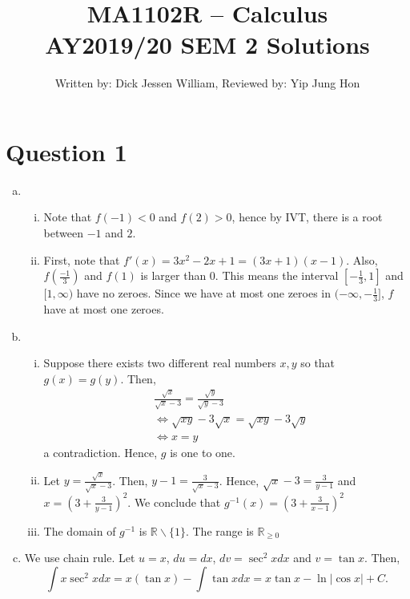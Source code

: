 \documentclass[12pt,a4paper]{article}
\author{Written by: Dick Jessen William, Reviewed by: Yip Jung Hon}
\title{MA1102R -- Calculus \\ AY2019/20 SEM 2 Solutions}
\begin{document}
	
	\maketitle
	
	\section*{Question 1}
	
	\begin{enumerate}[a.]
	    \item \begin{enumerate}[i.]
	     \item Note that $f(-1)<0$ and $f(2)>0$, hence by IVT, there is a root between $-1$ and $2$.
	    \item First, note that $f'(x) = 3x^2-2x+1 = (3x+1)(x-1)$. Also, $f(\frac{-1}{3})$ and $f(1)$ is larger than 0. This means the interval $[-\frac{1}{3},1]$ and $[1,\infty)$ have no zeroes. Since we have at most one zeroes in $(-\infty,-\frac{1}{3}]$, $f$ have at most one zeroes.
	    \end{enumerate}
	    \item
	    \begin{enumerate}[i.]
	    \item Suppose there exists two different real numbers $x,y$ so that $g(x)=g(y)$. Then,
	    \begin{align*}
	    &\frac{\sqrt{x}}{\sqrt{x}-3} = \frac{\sqrt{y}}{\sqrt{y}-3} \\
	     &\iff \sqrt{xy}-3\sqrt{x} = \sqrt{xy}-3\sqrt{y} \\
	     &\iff x = y
	    \end{align*}
	    a contradiction. Hence, $g$ is one to one.
	    \item Let $y = \frac{\sqrt{x}}{\sqrt{x}-3}$. Then, $y-1 = \frac{3}{\sqrt{x}-3}$. Hence, $\sqrt{x}-3 = \frac{3}{y-1}$ and $x = \left( 3+\frac{3}{y-1} \right)^2$. We conclude that $g^{-1}(x) = \left( 3+\frac{3}{x-1} \right)^2$
	    \item The domain of $g^{-1}$ is $\mathbb{R} \backslash \{ 1 \}$. The range is $\mathbb{R}_{\geq 0 }$
	    \end{enumerate} 
	    \item We use chain rule. Let $u = x$, $du=dx$, $dv = \sec^2{x} dx$ and $v = \tan{x}$. Then, $$\int x \sec^2{x} dx = x(\tan{x}) -\int \tan{x} dx = x\tan{x}-\ln{|\cos{x}|} +C.$$
	\end{enumerate}
\end{document}
